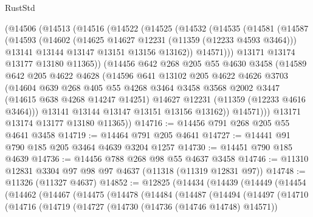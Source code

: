 \begin{lexlean}{RustStd}
\begin{coremodule}
{{{{{{{{{{{{{{{{{{{    (@14506
      (@14513
        (@14516
          (@14522
            (@14525
              (@14532
                (@14535
                  (@14581
                    (@14587
                      (@14593
                        (@14602
                          (@14625 @14627 @12231 (@11359 (@12233 @4593 @3464)))
                          @13141
                          @13144
                          @13147
                          @13151
                          @13156
                          @13162))
                      @14571)))
                @13171
                @13174
                @13177
                @13180
                @11365))
            (@14456
              @642
              @268
              @205
              @55
              @4630
              @3458
              (@14589
                @642
                @205
                @4622
                @4628
                (@14596
                  @641
                  @13102
                  @205
                  @4622
                  @4626
                  @3703
                  (@14604
                    @639
                    @268
                    @405
                    @55
                    @4268
                    @3464
                    @3458
                    @3568
                    @2002
                    @3447
                    (@14615 @638 @4268 @14247 @14251)
                    @14627
                    @12231
                    (@11359 (@12233 @4616 @3464)))
                  @13141
                  @13144
                  @13147
                  @13151
                  @13156
                  @13162))
              @14571)))
        @13171
        @13174
        @13177
        @13180
        @11365))
@14716 := @14456 @791 @268 @205 @55 @4641 @3458
@14719 := @14464 @791 @205 @4641
@14727 := @14441 @91 @790 @185 @205 @3464 @4639 @3204 @1257
@14730 := @14451 @790 @185 @4639
@14736 := @14456 @788 @268 @98 @55 @4637 @3458
@14746 := @11310 @12831 @3304 @97 @98 @97 @4637 (@11318 (@11319 @12831 @97))
@14748 := @11326 (@11327 @4637)
@14852 := @12825
    (@14434
      (@14439
        (@14449
          (@14454
            (@14462
              (@14467
                (@14475
                  (@14478
                    (@14484
                      (@14487
                        (@14494
                          (@14497
                            (@14710
                              (@14716
                                (@14719
                                  (@14727
                                    (@14730 (@14736 (@14746 @14748) @14571))
}}}}}}}}}}}}}}}}}}}
\end{coremodule}
\end{lexlean}
